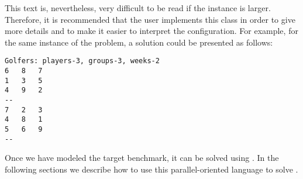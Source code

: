 This text is, nevertheless, very difficult to be read if the instance is larger. Therefore, it is recommended that the user implements this class in order to give more details and to make it easier to interpret the configuration. For example, for the same instance of the problem, a solution could be presented as follows:

\begin{Verbatim}
Golfers: players-3, groups-3, weeks-2
6	8	7	
1	3	5	
4	9	2	
--
7	2	3	
4	8	1	
5	6	9	
--
\end{Verbatim}

Once we have modeled the target benchmark, it can be solved using \posl{}. In the following sections we describe how to use this parallel-oriented language to solve \CSPs.